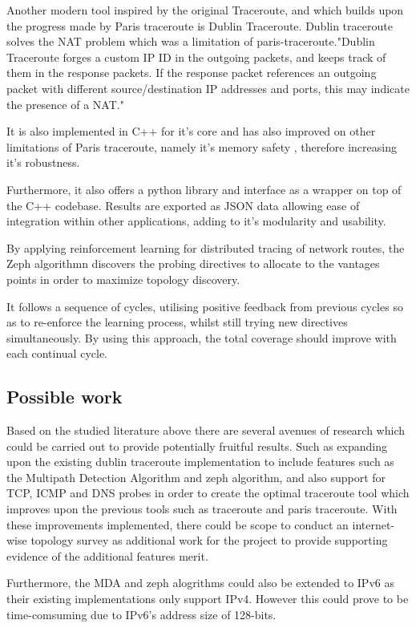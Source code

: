 Another modern tool inspired by the original Traceroute, and which builds upon the progress made by Paris traceroute is Dublin Traceroute. Dublin traceroute solves the NAT problem which was a limitation of paris-traceroute."Dublin Traceroute forges a custom IP ID in the outgoing packets, and keeps track of them in the response packets. If the response packet references an outgoing packet with different source/destination IP addresses and ports, this may indicate the presence of a NAT." \cite{dublin} \cite{dublin_website} 

It is also implemented in C++ for it's core and has also improved on other limitations of Paris traceroute, namely it's memory safety \cite{dublin}, therefore increasing it's robustness. 

Furthermore, it also offers a python library and interface as a wrapper on top of the C++ codebase. Results are exported as JSON data allowing ease of integration within other applications, adding to it's modularity and usability. \cite{dublin_website}


%


By applying reinforcement learning for distributed tracing of network routes, the Zeph algorithmn discovers the probing directives to allocate to the vantages points in order to maximize topology discovery. 

It follows a sequence of cycles, utilising positive feedback from previous cycles so as to re-enforce the learning process, whilst still trying new directives simultaneously. By using this approach, the total coverage should improve with each continual cycle. \cite{zephMap}




\subsection{Possible work}
Based on the studied literature above there are several avenues of research which could be carried out to provide potentially fruitful results. Such as expanding upon the existing dublin traceroute implementation to include features such as the Multipath Detection Algorithm and zeph algorithm, and also support for TCP, ICMP and DNS probes in order to create the optimal traceroute tool which improves upon the previous tools such as traceroute and paris traceroute. With these improvements implemented, there could be scope to conduct an internet-wise topology survey as additional work for the project to provide supporting evidence of the additional features merit. 

Furthermore, the MDA and zeph alogrithms could also be extended to IPv6 as their existing implementations only support IPv4. However this could prove to be time-comsuming due to IPv6's address size of 128-bits. 

\newpage


